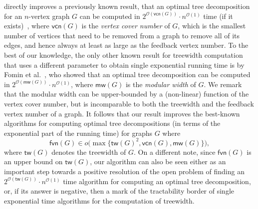 \documentclass[a4paper,UKenglish,cleveref, autoref, thm-restate, numberwithinsect]{lipics-v2021}
\newcounter{algorithm}
\newcommand{\OO}{\mathcal{O}}
\newcommand{\tw}{\mathsf{tw}}
\newcommand{\fvn}{\mathsf{fvn}}
\newcommand{\vcn}{\mathsf{vcn}}
\newcommand{\mw}{\mathsf{mw}}
\begin{document}
 directly improves a previously known result, that an optimal tree decomposition for an $n$-vertex graph $G$ can be computed in $2^{\OO(\vcn(G))}\cdot n^{\OO(1)}$ time (if it exists)~\cite{chapelle2017treewidth,fomin2018algorithms}, where $\vcn(G)$ is the \emph{vertex cover number} of $G$, which is the smallest number of vertices that need to be removed from a graph to remove all of its edges, and hence always at least as large as the feedback vertex number. To the best of our knowledge, the only other known result for treewidth computation that uses a different parameter to obtain single exponential running time is by Fomin et al.~\cite{fomin2018algorithms}, who showed that an optimal tree decomposition can be computed in $2^{\OO(\mw(G))}\cdot n^{\OO(1)}$, where $\mw(G)$ is the \emph{modular width} of $G$. We remark that the modular width can be upper-bounded by a (non-linear) function of the vertex cover number, but is incomparable to both the treewidth and the feedback vertex number of a graph.
It follows that our result improves the best-known algorithms for computing optimal tree decompositions (in terms of the exponential part of the running time) for graphs $G$ where 
\[
\fvn(G)\in o\bigl(\max\bigl\{\tw(G)^2,\vcn(G),\mw(G)\bigr\}\bigr),
\]
where $\tw(G)$ denotes the treewidth of $G$. 
On a different note, since $\fvn(G)$ is an upper bound on $\tw(G)$, our algorithm can also be seen either as an important step towards a positive resolution of the open problem of finding an $2^{\OO(\tw(G))}\cdot n^{\OO(1)}$ time algorithm for computing an optimal tree decomposition, or, if its answer is negative, then a mark of the tractability border of single exponential time algorithms for the computation of treewidth.
\end{document}
